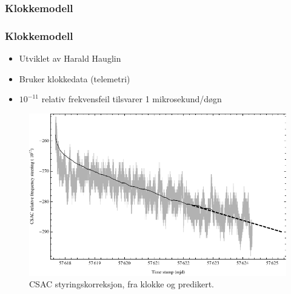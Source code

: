 \documentclass[xcolor=table]{beamer}
\begin{document}
\subsubsection{Klokkemodell}
\begin{frame}
  \frametitle{Klokkemodell}
  \begin{itemize}
    \item Utviklet av Harald Hauglin
    \item Bruker klokkedata (telemetri)
    \item $10^{-11}$ relativ frekvensfeil tilsvarer 1 mikrosekund/døgn
  \end{itemize}
    \begin{figure}
        \includegraphics[scale=0.6]{thesis/graphics/csac_modelling_prediction.pdf}
      \caption{CSAC styringskorreksjon, fra klokke og predikert.}
    \end{figure}
\end{frame}
\end{document}
